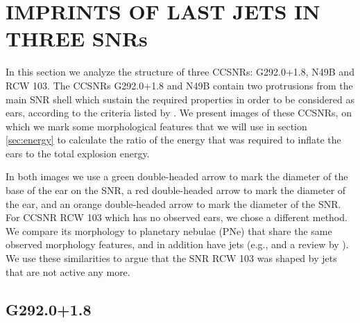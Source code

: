 \documentclass[12pt,preprint,a4paper]{aastex}
\begin{document}
\section{IMPRINTS OF LAST JETS IN THREE SNRs }
\label{sec:morphology}

In this section we analyze the structure of three CCSNRs: G292.0+1.8, N49B and RCW 103. The CCSNRs G292.0+1.8 and N49B contain two protrusions from the main SNR shell which sustain the required properties in order to be considered as ears, according to the criteria listed by \cite{GrichenerSoker2017}. We present images of these CCSNRs, on which we mark some morphological features that we will use in section \ref{sec:energy} to calculate the ratio of the energy that was required to inflate the ears to the total explosion energy. 

In both images we use a green double-headed arrow to mark the diameter of the base of the ear on the SNR, a red double-headed arrow to mark the diameter of the ear, and an orange double-headed arrow to mark the diameter of the SNR. For CCSNR RCW 103 which has no observed ears, we chose a different method. We compare its morphology to planetary nebulae (PNe) that share the same observed morphology features, and in addition have jets (e.g., \citealt{Tocknelletal2014} and a review by \citealt{Soker2016Rev}). We use these similarities to argue that the SNR RCW 103 was shaped by jets that are not active any more. 
 
\subsection{G292.0+1.8}
\end{document}
